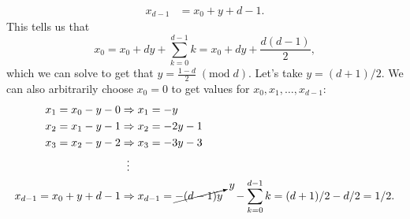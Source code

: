 \begin{enumerate}
\begin{equation}
\begin{split}
  x_{d-1} &= x_0 + y + d-1.
  \end{split}
\end{equation}
This tells us that 
\[
x_0 = x_0 + dy + \sum_{k=0}^{d-1} k =  x_0 + dy + \frac{d(d-1)}{2},
\]
which we can solve to get that $y = \frac{1-d}{2} \; (\text{mod}\; d)$. Let's take $y = (d+1)/2$. We can also arbitrarily choose $x_0 = 0$ to get values for $x_0, x_1, \ldots, x_{d-1}$:
\begin{equation}
  \begin{split}
      x_1 = x_0 - y - 0 & \Rightarrow x_1 = -y\\
  x_2 = x_1 - y - 1 & \Rightarrow x_2 = -2y - 1 \\
  x_3 = x_2 - y - 2 & \Rightarrow x_3 = -3y - 3 \\
  & \; \; \vdots \\
  x_{d-1} = x_0 + y + d-1 & \Rightarrow  x_{d-1} = \cancelto{y}{-(d-1)y} \quad - \sum_{k=0}^{d-1} k = (d+1)/2 - d/2 = 1/2.
  \end{split}
\end{equation}


\end{enumerate}
